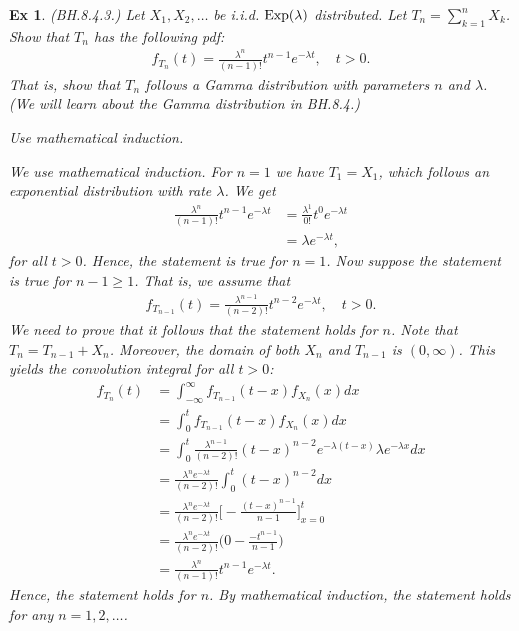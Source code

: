 \documentclass[a4paper,11pt]{article}
\newtheorem{exercise}[theorem]{Ex}
\begin{document}
\begin{exercise}
(BH.8.4.3.) Let $X_1, X_2, \ldots$ be i.i.d. $\mathrm{Exp}(\lambda)$ distributed. Let $T_n = \sum_{k=1}^n X_k$. Show that $T_n$ has the following pdf:
\begin{align}
    f_{T_n}(t) = \frac{\lambda^n}{(n-1)!} t^{n-1} e^{-\lambda t}, \quad t > 0.
\end{align}
That is, show that $T_n$ follows a \emph{Gamma distribution} with parameters $n$ and $\lambda$. (We will learn about the Gamma distribution in BH.8.4.)\\
\begin{hint}
Use mathematical induction.
\end{hint}

\begin{solution}
We use mathematical induction. For $n=1$ we have $T_1 = X_1$, which follows an exponential distribution with rate $\lambda$. We get
\begin{align}
    \frac{\lambda^n}{(n-1)!} t^{n-1} e^{-\lambda t} &= \frac{\lambda^1}{0!} t^{0} e^{-\lambda t}\\
    &= \lambda e^{-\lambda t},
\end{align}
for all $t>0$. Hence, the statement is true for $n=1$. Now suppose the statement is true for $n-1 \geq 1$. That is, we assume that
\begin{align}
    f_{T_{n-1}}(t) = \frac{\lambda^{n-1}}{(n-2)!} t^{n-2} e^{-\lambda t}, \quad t > 0.
\end{align}
We need to prove that it follows that the statement holds for $n$. Note that $T_n = T_{n-1} + X_n$. Moreover, the domain of both $X_n$ and $T_{n-1}$ is $(0,\infty)$. This yields the convolution integral for all $t>0$:
\begin{align}
    f_{T_n}(t) &= \int_{-\infty}^{\infty} f_{T_{n-1}}(t - x) f_{X_n}(x) dx \\
    &= \int_0^t f_{T_{n-1}}(t - x) f_{X_n}(x) dx \\
    &= \int_0^t \frac{\lambda^{n-1}}{(n-2)!} (t-x)^{n-2} e^{-\lambda (t-x)} \lambda e^{-\lambda x} dx \\
    &= \frac{\lambda^{n} e^{-\lambda t}}{(n-2)!} \int_0^t (t-x)^{n-2}  dx \\
    &= \frac{\lambda^{n} e^{-\lambda t}}{(n-2)!} \Bigg[ -\frac{(t - x)^{n-1}}{n-1} \Bigg]_{x=0}^t \\
    &= \frac{\lambda^{n} e^{-\lambda t}}{(n-2)!} \Bigg( 0 - \frac{-t^{n-1}}{n-1} \Bigg) \\
    &= \frac{\lambda^{n} }{(n-1)!} t^{n-1} e^{-\lambda t}.
\end{align}
Hence, the statement holds for $n$. By mathematical induction, the statement holds for any $n=1,2,\ldots$.
\end{solution}
\end{exercise}
\end{document}
